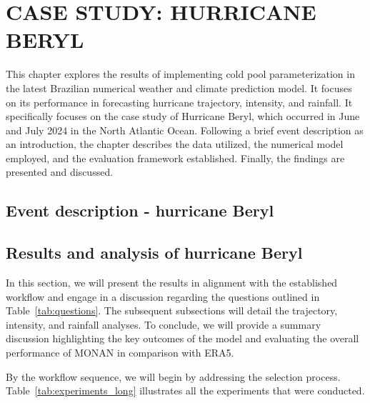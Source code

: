 
\chapter{CASE STUDY: HURRICANE BERYL}
\label{ch:beryl}

This chapter explores the results of implementing cold pool parameterization in the latest Brazilian numerical weather and climate prediction model. It focuses on its performance in forecasting hurricane trajectory, intensity, and rainfall. It specifically focuses on the case study of Hurricane Beryl, which occurred in June and July 2024 in the North Atlantic Ocean. Following a brief event description as an introduction, the chapter describes the data utilized, the numerical model employed, and the evaluation framework established. Finally, the findings are presented and discussed.

\section{Event description - hurricane Beryl}

\pagebreak



\section{Results and analysis of hurricane Beryl}

In this section, we will present the results in alignment with the established workflow and engage in a discussion regarding the questions outlined in Table~\ref{tab:questions}. The subsequent subsections will detail the trajectory, intensity, and rainfall analyses. To conclude, we will provide a summary discussion highlighting the key outcomes of the model and evaluating the overall performance of MONAN in comparison with ERA5.

By the workflow sequence, we will begin by addressing the selection process. Table~\ref{tab:experiments_long} illustrates all the experiments that were conducted.

\begin{center}
 \label{tab:experiments_long}
\end{center}

